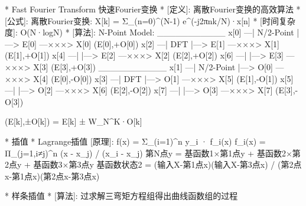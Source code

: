 	* Fast Fourier Transform 快速Fourier变换
	*	[定义]: 离散Fourier变换的高效算法
	*	[公式]:
			离散Fourier变换: X[k] = Σ_(n=0)^(N-1)  e^(-j2πnk/N)·x[n]
	*	[时间复杂度]: O(N·logN)
	*	[算法]:
			N-Point Model:
					___________
			x[0] —| N/2-Point |—> E[0] —×××> X[0]  (E[0],+O[0])
			x[2] —|   DFT	   |—> E[1] —×××> X[1]  (E[1],+O[1])
			x[4] —|		   |—> E[2] —×××> X[2]  (E[2],+O[2])
			x[6] —|		   |—> E[3] —×××> X[3]  (E[3],+O[3])
					___________
			x[1] —| N/2-Point |—> O[0] —×××> X[4]  (E[0],-O[0])
			x[3] —|   DFT	   |—> O[1] —×××> X[5]  (E[1],-O[1])
			x[5] —|		   |—> O[2] —×××> X[6]  (E[2],-O[2])
			x[7] —|		   |—> O[3] —×××> X[7]  (E[3],-O[3])

			(E[k],±O[k]) = E[k] ± W_N^K·O[k]

* 插值
	* Lagrange插值
		[原理]:
			f(x) = Σ_(i=1)^n  y_i · f_i(x)
			f_i(x) = Π_(j=1,i≠j)^n  (x - x_j) / (x_i - x_j)
			第N点y = 基函数1×第1点y + 基函数2×第2点y + 基函数3×第3点y
			基函数状态2 = (输入X-第1点x)(输入X-第3点x) / (第2点x-第1点x)(第2点x-第3点x)


	* 样条插值
	*	[算法]: 过求解三弯矩方程组得出曲线函数组的过程
